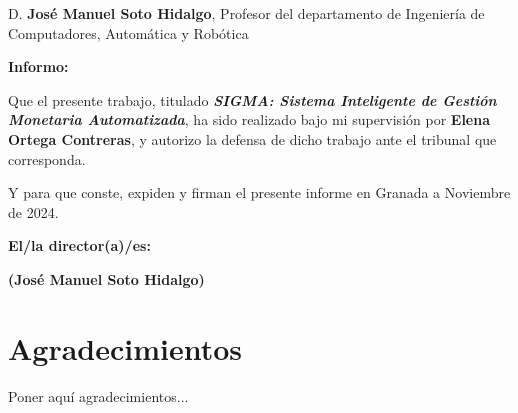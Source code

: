 D. \textbf{José Manuel Soto Hidalgo}, Profesor del departamento de Ingeniería de Computadores, Automática y Robótica

\vspace{0.5cm}

\textbf{Informo:}

\vspace{0.5cm}

Que el presente trabajo, titulado \textit{\textbf{SIGMA: Sistema Inteligente de Gestión Monetaria Automatizada}},
ha sido realizado bajo mi supervisión por \textbf{Elena Ortega Contreras}, y autorizo la defensa de dicho trabajo ante el tribunal
que corresponda.

\vspace{0.5cm}

Y para que conste, expiden y firman el presente informe en Granada a Noviembre de 2024.

\vspace{1cm}

\textbf{El/la director(a)/es: }

\vspace{5cm}

\noindent \textbf{(José Manuel Soto Hidalgo)}

\chapter*{Agradecimientos}

Poner aquí agradecimientos...

